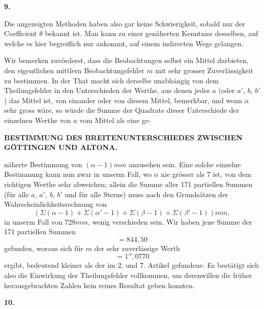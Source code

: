 \begin{center}\textbf{9.}\end{center}

Die angezeigten Methoden haben also gar keine Schwierigkeit, sobald nur
der Coefficient \(\theta\) bekannt ist. Man kann zu einer genäherten Kenntniss desselben,
auf welche es hier begreiflich nur ankommt, auf einem indirecten
Wege gelangen.

Wir bemerken zuvörderst, dass die Beobachtungen selbst ein Mittel darbieten,
den eigentlichen mittlern Beobachtungsfehler \(m\) mit sehr grosser
Zuverlässigkeit zu bestimmen. In der That macht sich derselbe unabhängig von
dem Theilungsfehler in den Unterschieden der  Werthe, aus denen
jedes \(a\) (oder \(a'\), \(b\), \(b'\)) das Mittel ist, von einander oder von diesem Mittel,
bemerkbar, und wenn \(\alpha\) sehr gross wäre, so würde die Summe der Quadrate
dieser Unterschiede der einzelnen Werthe von \(a\) vom Mittel als eine ge-
\par

\par\clearpage
\noindent{}\parbox[t]{\dimexpr\linewidth-24mm\relax}{\centering\scriptsize\bfseries BESTIMMUNG DES BREITENUNTERSCHIEDES ZWISCHEN GÖTTINGEN UND ALTONA.}\makebox[12mm][r]{}\par\medskip

\noindent näherte Bestimmung von \((\alpha-1)mm\) anzusehen sein. Eine solche einzelne
Bestimmung kann nun zwar in unserm Fall, wo \(\alpha\) nie grösser als 7 ist, von
dem richtigen Werthe sehr abweichen; allein die Summe aller 171 partiellen
Summen (für alle \(a\), \(a'\), \(b\), \(b'\) und für alle Sterne) muss nach den Grundsätzen
der Wahrscheinlichkeitsrechnung von
\[
(\Sigma(\alpha-1)+\Sigma(\alpha'-1)+\Sigma(\beta-1)+\Sigma(\beta'-1))mm,
\]
\noindent in unserm Fall von \(728mm\), wenig verschieden sein. Wir haben jene Summe
der 171 partiellen Summen
\[
=844{,}50
\]
\noindent gefunden, woraus sich für \(m\) der sehr zuverlässige Werth
\[
=1''{,}0770
\]
\noindent ergibt, bedeutend kleiner als der im 2. und 7. Artikel gefundene. Es bestätigt
sich also die Einwirkung der Theilungsfehler vollkommen, um derenwillen
die früher herausgebrachten Zahlen kein reines Resultat geben konnten.

\begin{center}\textbf{10.}\end{center}

